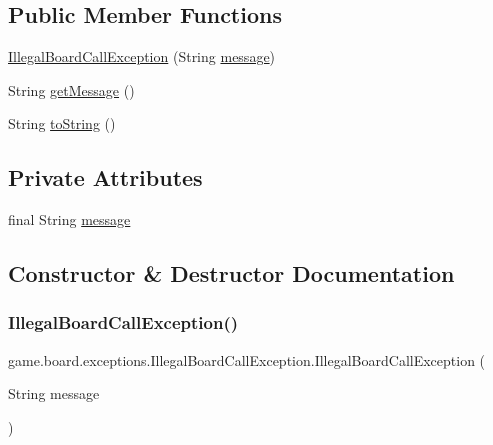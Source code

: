 \subsection*{Public Member Functions}
\begin{DoxyCompactItemize}
\item 
\mbox{\hyperlink{classgame_1_1board_1_1exceptions_1_1_illegal_board_call_exception_aa7e96bab105b32165e3cf682f8141493}{Illegal\+Board\+Call\+Exception}} (String \mbox{\hyperlink{classgame_1_1board_1_1exceptions_1_1_illegal_board_call_exception_ac2baf1c9ea0310f050b3b419df664fb1}{message}})
\item 
String \mbox{\hyperlink{classgame_1_1board_1_1exceptions_1_1_illegal_board_call_exception_a1ef3de6f6959bbe2d43a5180fdb662bd}{get\+Message}} ()
\item 
String \mbox{\hyperlink{classgame_1_1board_1_1exceptions_1_1_illegal_board_call_exception_a02111b0dc23e589949d8724cd276ae99}{to\+String}} ()
\end{DoxyCompactItemize}
\subsection*{Private Attributes}
\begin{DoxyCompactItemize}
\item 
final String \mbox{\hyperlink{classgame_1_1board_1_1exceptions_1_1_illegal_board_call_exception_ac2baf1c9ea0310f050b3b419df664fb1}{message}}
\end{DoxyCompactItemize}


\subsection{Constructor \& Destructor Documentation}
\mbox{\label{classgame_1_1board_1_1exceptions_1_1_illegal_board_call_exception_aa7e96bab105b32165e3cf682f8141493}} 
\subsubsection{\texorpdfstring{Illegal\+Board\+Call\+Exception()}{IllegalBoardCallException()}}
{\footnotesize\ttfamily game.\+board.\+exceptions.\+Illegal\+Board\+Call\+Exception.\+Illegal\+Board\+Call\+Exception (\begin{DoxyParamCaption}\item[{String}]{message }\end{DoxyParamCaption})\hspace{0.3cm}{\ttfamily [inline]}}



